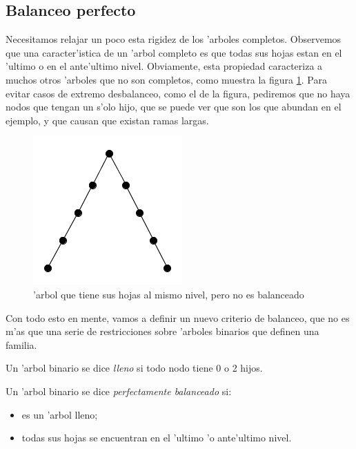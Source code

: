 \subsection{Balanceo perfecto}

Necesitamos relajar un poco esta rigidez de los 'arboles completos. Observemos que una caracter'istica de un 'arbol completo es que todas sus hojas estan en el 'ultimo o en el ante'ultimo nivel. Obviamente, esta propiedad caracteriza a muchos otros 'arboles que no son completos, como muestra la figura \ref{fig1}. Para evitar casos de extremo desbalanceo, como el de la figura, pediremos que no haya nodos que tengan un s'olo hijo, que se puede ver que son los que abundan en el ejemplo, y que causan que existan ramas largas.

\begin{figure}[h]
	\begin{center}
	\includegraphics[scale=0.6]{imagenes/fig1.jpg}
	\end{center}
	
	\caption{'arbol que tiene sus hojas al mismo nivel, pero no es balanceado}
	\label{fig1}
\end{figure}

Con todo esto en mente, vamos a definir un nuevo criterio de balanceo, que no es m'as que una serie de restricciones sobre 'arboles binarios que definen una familia.

\begin{defi}
	Un 'arbol binario se dice \textit{lleno} si todo nodo tiene 0 o 2 hijos.
\end{defi}

\begin{defi}
	Un 'arbol binario se dice \textit{perfectamente balanceado} si:
	\begin{itemize}
		\item es un 'arbol lleno;
		\item todas sus hojas se encuentran en el 'ultimo 'o ante'ultimo nivel.
	\end{itemize}
\end{defi}

